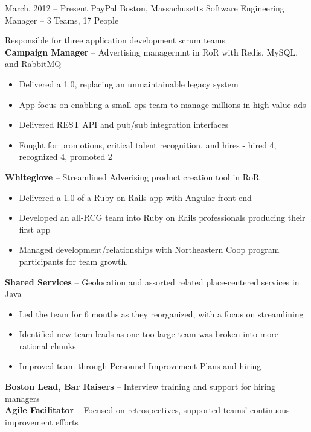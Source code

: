 \documentclass[]{friggeri-cv}
\begin{document}
\begin{entrylist}
  \entryalt
    {March, 2012 -- Present}
    {PayPal}
    {Boston, Massachusetts}
    {Software Engineering Manager -- 3 Teams, 17 People}
    {Responsible for three application development scrum teams \\
      \textbf{Campaign Manager} -- Advertising managermnt in RoR with Redis, MySQL,
      and RabbitMQ
    \begin{itemize}
      \item Delivered a 1.0, replacing an unmaintainable legacy system
      \item App focus on enabling a small ops team to manage millions in
        high-value ads
      \item Delivered REST API and pub/sub integration interfaces
      \item Fought for promotions, critical talent recognition, and hires - hired 4, recognized 4, promoted 2
    \end{itemize}
      \textbf{Whiteglove} -- Streamlined Adverising product creation tool in RoR
    \begin{itemize}
      \item Delivered a 1.0 of a Ruby on Rails app with Angular front-end
      \item Developed an all-RCG team into Ruby on Rails professionals
        producing their first app
      \item Managed development/relationships with Northeastern Coop program
        participants for team growth.
    \end{itemize} 
      \textbf{Shared Services} -- Geolocation and assorted related place-centered
      services in Java
    \begin{itemize}
      \item Led the team for 6 months as they reorganized, with a focus on
        streamlining
      \item Identified new team leads as one too-large team was broken
        into more rational chunks
      \item Improved team through Personnel Improvement Plans and hiring
    \end{itemize}
    \textbf{Boston Lead, Bar Raisers} -- Interview training and support for hiring managers\\
    \textbf{Agile Facilitator} -- Focused on retrospectives, supported teams' continuous improvement efforts}


\end{entrylist}
\end{document}
